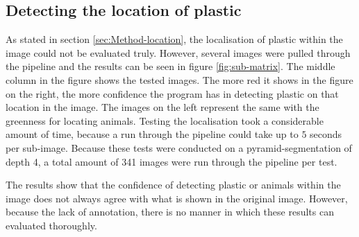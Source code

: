 \subsection{Detecting the location of plastic}
\label{sec:Results-location}
As stated in section \ref{sec:Method-location}, the localisation of plastic within the image could not be evaluated truly.
However, several images were pulled through the pipeline and the results can be seen in figure \ref{fig:sub-matrix}.
The middle column in the figure shows the tested images.
The more red it shows in the figure on the right, the more confidence the program has in detecting plastic on that location in the image.
The images on the left represent the same with the greenness for locating animals.
Testing the localisation took a considerable amount of time, because a run through the pipeline could take up to $5$ seconds per sub-image.
Because these tests were conducted on a pyramid-segmentation of depth 4, a total amount of 341 images were run through the pipeline per test.

The results show that the confidence of detecting plastic or animals within the image does not always agree with what is shown in the original image.
However, because the lack of annotation, there is no manner in which these results can evaluated thoroughly.

